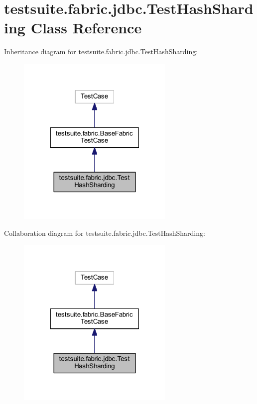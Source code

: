 \hypertarget{classtestsuite_1_1fabric_1_1jdbc_1_1_test_hash_sharding}{}\section{testsuite.\+fabric.\+jdbc.\+Test\+Hash\+Sharding Class Reference}
\label{classtestsuite_1_1fabric_1_1jdbc_1_1_test_hash_sharding}


Inheritance diagram for testsuite.\+fabric.\+jdbc.\+Test\+Hash\+Sharding\+:
\nopagebreak
\begin{figure}[H]
\begin{center}
\leavevmode
\includegraphics[width=213pt]{classtestsuite_1_1fabric_1_1jdbc_1_1_test_hash_sharding__inherit__graph}
\end{center}
\end{figure}


Collaboration diagram for testsuite.\+fabric.\+jdbc.\+Test\+Hash\+Sharding\+:
\nopagebreak
\begin{figure}[H]
\begin{center}
\leavevmode
\includegraphics[width=213pt]{classtestsuite_1_1fabric_1_1jdbc_1_1_test_hash_sharding__coll__graph}
\end{center}
\end{figure}
